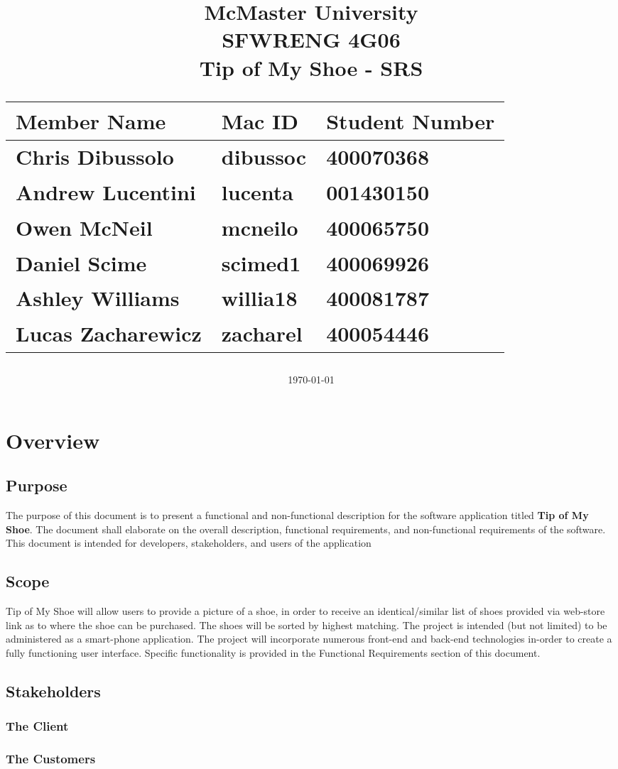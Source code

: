\documentclass[12pt, titlepage]{article}
\title{
McMaster University\\
SFWRENG 4G06\\
\bigskip\bigskip\bigskip
{\bf Tip of My Shoe - SRS\\}
\bigskip\bigskip\bigskip\bigskip
\begin{table}[h!]
\begin{center}
\begin{tabular}{|p{5cm}|p{5cm}|p{5cm}|}
	\hline
	\bf Member Name & \bf Mac ID & \bf Student Number\\
	\hline
	\hline
	Chris Dibussolo & dibussoc & 400070368\\
	\hline
  Andrew Lucentini & lucenta & 001430150\\
  \hline
	Owen McNeil & mcneilo & 400065750 \\
	\hline
	Daniel Scime & scimed1 & 400069926\\
	\hline
  Ashley Williams & willia18 & 400081787\\
	\hline
  Lucas Zacharewicz & zacharel & 400054446\\
	\hline
\end{tabular}
\end{center}
\end{table}
\date{\today}
}
\begin{document}
\maketitle
\tableofcontents
\newpage


\section{Overview}

\subsection{Purpose}
The purpose of this document is to present a functional and non-functional description for the software application titled \textbf{Tip of My Shoe}. The document shall elaborate on the overall description, functional requirements, and non-functional requirements of the software. This document is intended for developers, stakeholders, and users of the application

\subsection{Scope}

Tip of My Shoe will allow users to provide a picture of a shoe, in order to receive an identical/similar list of shoes provided via web-store link as to where the shoe can be purchased. The shoes will be sorted by highest matching. The project is intended (but not limited) to be administered as a smart-phone application. The project will incorporate numerous front-end and back-end technologies in-order to create a fully functioning user interface. Specific functionality is provided in the Functional Requirements section of this document.

\subsection{Stakeholders}

\subsubsection{The Client}

\subsubsection{The Customers}
\end{document}

